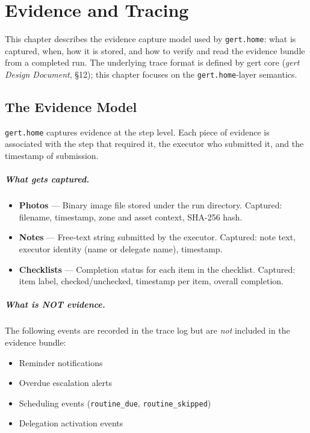 \chapter{Evidence and Tracing}
\label{ch:evidence-tracing}

This chapter describes the evidence capture model used by \texttt{gert.home}: what is
captured, when, how it is stored, and how to verify and read the evidence bundle from a
completed run. The underlying trace format is defined by gert core (\emph{gert Design
Document}, §12); this chapter focuses on the \texttt{gert.home}-layer semantics.

\section{The Evidence Model}
\label{sec:evidence-model}

\texttt{gert.home} captures evidence at the step level. Each piece of evidence is associated
with the step that required it, the executor who submitted it, and the timestamp of submission.

\paragraph{What gets captured.}
\begin{itemize}
  \item \textbf{Photos} --- Binary image file stored under the run directory.
        Captured: filename, timestamp, zone and asset context, SHA-256 hash.
  \item \textbf{Notes} --- Free-text string submitted by the executor.
        Captured: note text, executor identity (name or delegate name), timestamp.
  \item \textbf{Checklists} --- Completion status for each item in the checklist.
        Captured: item label, checked/unchecked, timestamp per item, overall completion.
\end{itemize}

\paragraph{What is NOT evidence.}
The following events are recorded in the trace log but are \emph{not} included in the
evidence bundle:
\begin{itemize}
  \item Reminder notifications
  \item Overdue escalation alerts
  \item Scheduling events (\texttt{routine\_due}, \texttt{routine\_skipped})
  \item Delegation activation events
\end{itemize}

